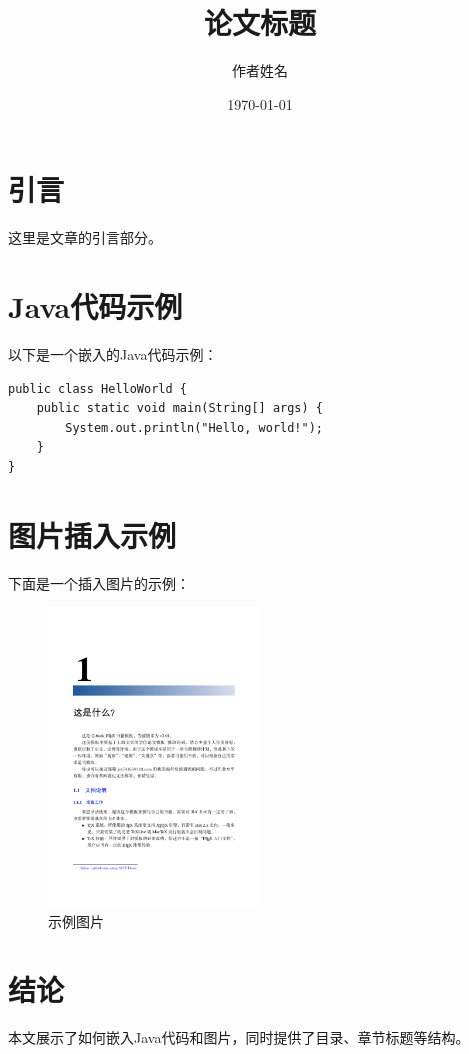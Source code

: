 \documentclass[12pt]{article}
\title{论文标题}
\author{作者姓名}
\date{\today}
\begin{document}
\maketitle

\tableofcontents
\newpage

\section{引言}
这里是文章的引言部分。

\section{Java代码示例}
以下是一个嵌入的Java代码示例：

\begin{lstlisting}[style=java, caption={HelloWorld.java}]
public class HelloWorld {
    public static void main(String[] args) {
        System.out.println("Hello, world!");
    }
}
\end{lstlisting}

\section{图片插入示例}
下面是一个插入图片的示例：

\begin{figure}[h]
    \centering
    \includegraphics[width=0.5\textwidth]{9.png} %
    \caption{示例图片}
    \label{fig:example}
\end{figure}

\section{结论}
本文展示了如何嵌入Java代码和图片，同时提供了目录、章节标题等结构。
\end{document}
